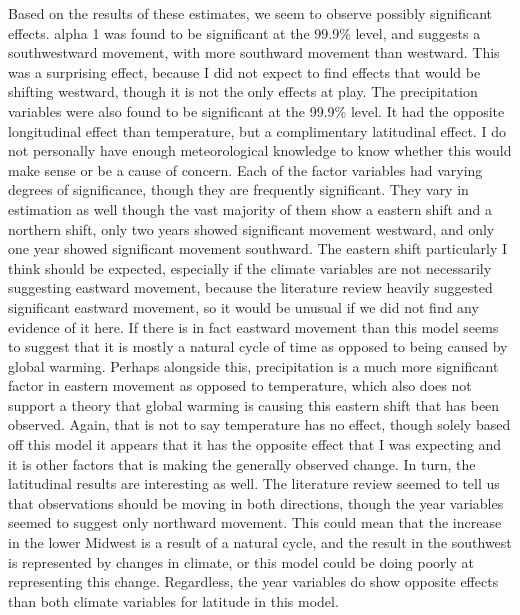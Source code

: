 \documentclass[12pt,english]{article}
\begin{document}
Based on the results of these estimates, we seem to observe possibly significant effects. alpha 1 was found to be significant at the 99.9\% level, and suggests a southwestward movement, with more southward movement than westward. This was a surprising effect, because I did not expect to find effects that would be shifting westward, though it is not the only effects at play. The precipitation variables were also found to be significant at the 99.9\% level. It had the opposite longitudinal effect than temperature, but a complimentary latitudinal effect. I do not personally have enough meteorological knowledge to know whether this would make sense or be a cause of concern. Each of the factor variables had varying degrees of significance, though they are frequently significant. They vary in estimation as well though the vast majority of them show a eastern shift and a northern shift, only two years showed significant movement westward, and only one year showed significant movement southward. The eastern shift particularly I think should be expected, especially if the climate variables are not necessarily suggesting eastward movement, because the literature review heavily suggested significant eastward movement, so it would be unusual if we did not find any evidence of it here. If there is in fact eastward movement than this model seems to suggest that it is mostly a natural cycle of time as opposed to being caused by global warming. Perhaps alongside this, precipitation is a much more significant factor in eastern movement as opposed to temperature, which also does not support a theory that global warming is causing this eastern shift that has been observed. Again, that is not to say temperature has no effect, though solely based off this model it appears that it has the opposite effect that I was expecting and it is other factors that is making the generally observed change. In turn, the latitudinal results are interesting as well. The literature review seemed to tell us that observations should be moving in both directions, though the year variables seemed to suggest only northward movement. This could mean that the increase in the lower Midwest is a result of a natural cycle, and the result in the southwest is represented by changes in climate, or this model could be doing poorly at representing this change. Regardless, the year variables do show opposite effects than both climate variables for latitude in this model.\\
\end{document}
